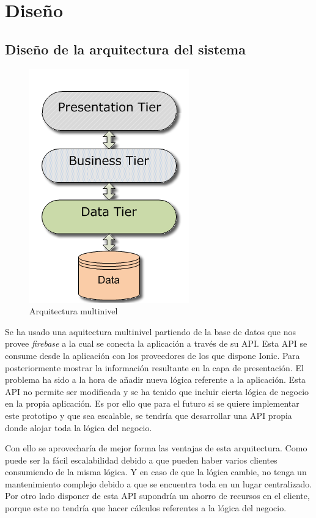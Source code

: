 \section{Diseño}
\subsection{Diseño de la arquitectura del sistema}

\begin{figure}[!h]
    \centering
    \includegraphics[]{images/multilevel-architecture.png}
    \caption{Arquitectura multinivel}
    \label{multilevel-architecture}
\end{figure}

Se ha usado una aquitectura multinivel partiendo de la base de datos que nos provee
\textit{firebase} a la cual se conecta la aplicación a través de su API. Esta API
se consume desde la aplicación con los proveedores de los que dispone Ionic. Para
posteriormente mostrar la información resultante en la capa de presentación.
El problema ha sido a la hora de añadir nueva lógica referente a la aplicación.
Esta API no permite ser modificada y se ha tenido que incluir cierta lógica de
negocio en la propia aplicación. Es por ello que para el futuro si se quiere
implementar este prototipo y que sea escalable, se tendría que desarrollar una
API propia donde alojar toda la lógica del negocio.

\medskip
Con ello se aprovecharía de mejor forma las ventajas de esta arquitectura. Como
puede ser la fácil escalabilidad debido a que pueden haber varios clientes
consumiendo de la misma lógica. Y en caso de que la lógica cambie, no tenga un
mantenimiento complejo debido a que se encuentra toda en un lugar centralizado.
Por otro lado disponer de esta API supondría un ahorro de recursos en el cliente,
porque este no tendría que hacer cálculos referentes a la lógica del negocio.

